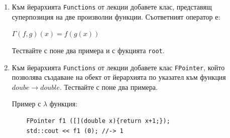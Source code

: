 \documentclass[12pt,a4paper]{article}
\newcommand{\code}[1]{\texttt{#1}}
\begin{document}
\begin{enumerate}
	\item Към йерархията \code{Functions} от лекции добавете клас, представящ суперпозиция на две произволни функции. Съответният оператор е:

	$\Gamma(f,g)(x) = f(g(x))$

	Тествайте с поне два примера и с фукцията \code{root}.

	\item Към йерархията \code{Functions} от лекции добавете клас \code{FPointer}, който позволява създаване на обект от йерархията по указател към функция $doube \rightarrow double$. Тествайте с поне два примера.

	\begin{mdframed}[hidealllines=true,backgroundcolor=gray!20]
	Пример с $\lambda$ функция:\\
	\begin{lstlisting}
	FPointer f1 ([](double x){return x+1;});
	std::cout << f1 (0); //-> 1
	\end{lstlisting}


	\end{mdframed}

\end{enumerate}







	\vspace{20px}
\end{document}
